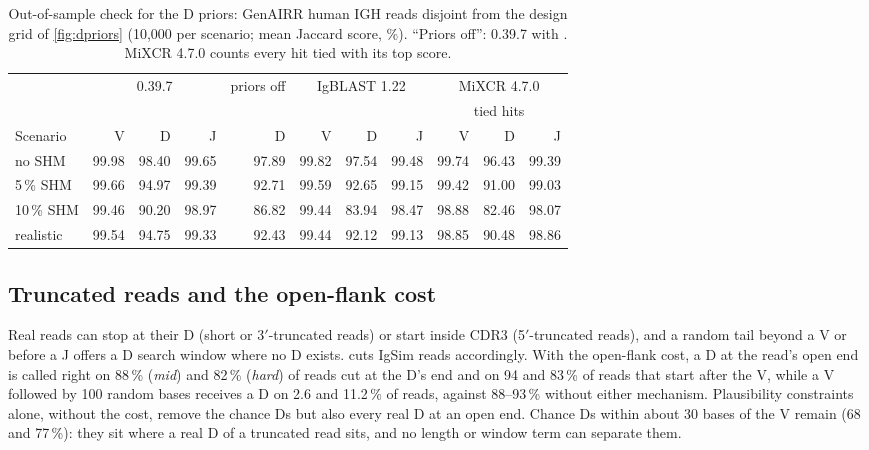 \documentclass[11pt,a4paper]{article}
\begin{document}
\begin{table}[tbp]
\centering
\caption{Out-of-sample check for the D priors: GenAIRR human IGH reads
disjoint from the design grid of \cref{fig:dpriors} (10,000 per scenario;
mean Jaccard score, \%). ``Priors off'': \swig{} 0.39.7 with
. MiXCR 4.7.0 counts every hit tied
with its top score.}
\label{tab:oos}
\footnotesize
\setlength{\tabcolsep}{3.2pt}
\begin{tabular}{@{}l rrr r rrr rrr@{}}
\toprule
 & \multicolumn{3}{c}{\swig{} 0.39.7} & priors off & \multicolumn{3}{c}{IgBLAST 1.22} & \multicolumn{3}{c}{MiXCR 4.7.0} \\
 & & & & & & & & \multicolumn{3}{c}{tied hits} \\
\cmidrule(lr){2-4}\cmidrule(lr){5-5}\cmidrule(lr){6-8}\cmidrule(l){9-11}
Scenario & V & D & J & D & V & D & J & V & D & J \\
\midrule
no SHM     & 99.98 & 98.40 & 99.65 & 97.89 & 99.82 & 97.54 & 99.48 & 99.74 & 96.43 & 99.39 \\
5\,\% SHM  & 99.66 & 94.97 & 99.39 & 92.71 & 99.59 & 92.65 & 99.15 & 99.42 & 91.00 & 99.03 \\
10\,\% SHM & 99.46 & 90.20 & 98.97 & 86.82 & 99.44 & 83.94 & 98.47 & 98.88 & 82.46 & 98.07 \\
realistic  & 99.54 & 94.75 & 99.33 & 92.43 & 99.44 & 92.12 & 99.13 & 98.85 & 90.48 & 98.86 \\
\bottomrule
\end{tabular}
\end{table}

\subsection{Truncated reads and the open-flank cost}
\label{sec:truncated}

Real reads can stop at their D (short or 3$'$-truncated reads) or start
inside CDR3 (5$'$-truncated reads), and a random tail beyond a V or before a J offers a D search
window where no D exists.  cuts IgSim reads accordingly.
With the open-flank cost, a D at the read's open end is called right on 88\,\%
(\emph{mid}) and 82\,\% (\emph{hard}) of reads cut at the D's end and on 94 and
83\,\% of reads that start after the V, while a V followed by 100 random bases
receives a D on 2.6 and 11.2\,\% of reads, against 88--93\,\% without either
mechanism. Plausibility constraints alone, without the cost, remove the
chance Ds but also every real D at an open end. Chance Ds within about 30
bases of the V remain (68 and 77\,\%): they sit where a real D of a truncated
read sits, and no length or window term can separate them.
\end{document}

